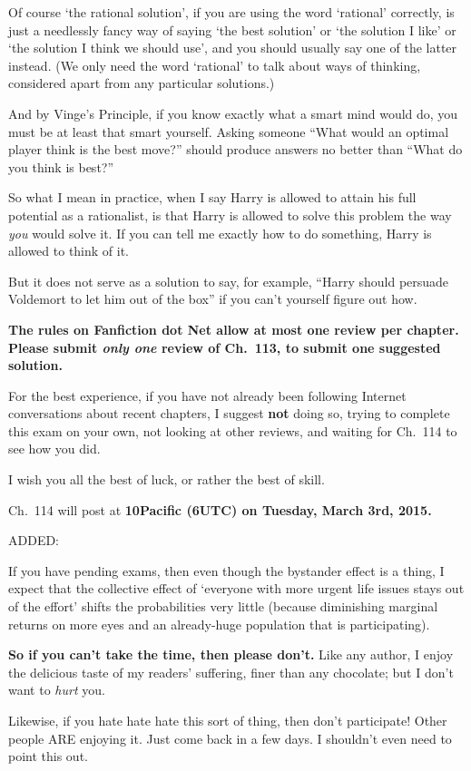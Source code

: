 {{Of course ‘the rational solution’, if you are using the word ‘rational’ correctly, is just a needlessly fancy way of saying ‘the best solution’ or ‘the solution I like’ or ‘the solution I think we should use’, and you should usually say one of the latter instead. (We only need the word ‘rational’ to talk about ways of thinking, considered apart from any particular solutions.)

And by Vinge’s Principle, if you know exactly what a smart mind would do, you must be at least that smart yourself. Asking someone “What would an optimal player think is the best move?” should produce answers no better than “What do you think is best?”

So what I mean in practice, when I say Harry is allowed to attain his full potential as a
rationalist, is that Harry is allowed to solve this problem the way \emph{you} would solve it. If you can tell me exactly how to do something, Harry is allowed to think of it.

But it does not serve as a solution to say, for example, “Harry should persuade Voldemort to let him out of the box” if you can’t yourself figure out how.

\textbf{The rules on Fanfiction dot Net allow at most one review per chapter. Please submit \emph{only one} review of Ch.~113, to submit one suggested solution.}

For the best experience, if you have not already been following Internet conversations about recent chapters, I suggest \textbf{not} doing so, trying to complete this exam on your own, not looking at other reviews, and waiting for Ch.~114 to see how you did.

I wish you all the best of luck, or rather the best of skill.

Ch.~114 will post at \textbf{10\am Pacific (6\pm UTC) on Tuesday, March 3rd, 2015.}

ADDED:

If you have pending exams, then even though the bystander effect is a thing,
I expect that the collective effect of ‘everyone with more urgent life issues stays out of the effort’ shifts the probabilities very little (because diminishing marginal returns on more eyes and an already-huge population that is participating).

\textbf{So if you can’t take the time, then please don’t.} Like any author, I enjoy the delicious taste of my readers’ suffering, finer than any chocolate; but I don’t want to \emph{hurt} you.

Likewise, if you hate hate hate this sort of thing, then don’t participate! Other people ARE enjoying it. Just come back in a few days. I shouldn’t even need to point this out.

}}
